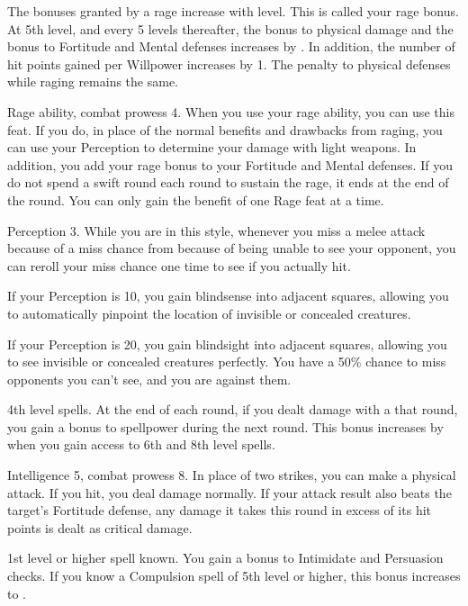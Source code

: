 The bonuses granted by a rage increase with level.
This is called your rage bonus.
At 5th level, and every 5 levels thereafter, the bonus to physical damage and the bonus to Fortitude and Mental defenses increases by .
In addition, the number of hit points gained per Willpower increases by 1.
The penalty to physical defenses while raging remains the same.

\featpres Rage ability, combat prowess 4.
\featben When you use your rage ability, you can use this feat. If you do, in place of the normal benefits and drawbacks from raging, you can use your Perception to determine your damage with light weapons.
In addition, you add your rage bonus to your Fortitude and Mental defenses.
If you do not spend a swift round each round to sustain the rage, it ends at the end of the round.
 You can only gain the benefit of one Rage feat at a time.

\featpre Perception 3.
\featben While you are in this style, whenever you miss a melee attack because of a miss chance from because of being unable to see your opponent, you can reroll your miss chance one time to see if you actually hit.
\par If your Perception is 10, you gain blindsense into adjacent squares, allowing you to automatically pinpoint the location of invisible or concealed creatures.
\par If your Perception is 20, you gain blindsight into adjacent squares, allowing you to see invisible or concealed creatures perfectly.
You have a 50\% chance to miss opponents you can't see, and you are  against them.

\featpres 4th level spells.
\featben At the end of each round, if you dealt damage with a  that round, you gain a  bonus to spellpower during the next round.
This bonus increases by  when you gain access to 6th and 8th level spells.

\featpres Intelligence 5, combat prowess 8.
\featben In place of two strikes, you can make a physical attack.
If you hit, you deal damage normally.
If your attack result also beats the target's Fortitude defense, any damage it takes this round in excess of its hit points is dealt as critical damage.

\featpre 1st level or higher  spell known.
\featben You gain a  bonus to Intimidate and Persuasion checks.
If you know a Compulsion spell of 5th level or higher, this bonus increases to .

